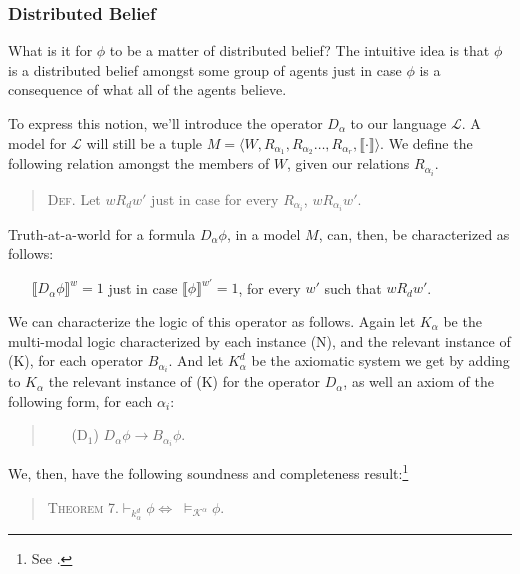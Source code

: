 \subsubsection{Distributed Belief}\label{caie-section1-4}

What is it for $\phi$ to be a matter of distributed belief?
The intuitive idea is that $\phi$ is a distributed belief amongst some group of agents just in case $\phi$ is a consequence of what all of the agents believe.

To express this notion, we'll introduce the operator $D_\alpha$ to our language $\mathcal{L}$. 
A model for $\mathcal{L}$ will still be a tuple $M = \langle W, R_{\alpha_1}, R_{\alpha_2}\ldots,R_{\alpha_r},  \llbracket \cdot \rrbracket \rangle$.
We define the following relation amongst the members of $W$, given our relations $R_{\alpha_i}$.
\begin{quote}
\textsc{Def.}\; Let $w R_d w'$ just in case for every $R_{\alpha_i}$, $w R_{\alpha_i} w'$.
\end{quote}
Truth-at-a-world for a formula $D_\alpha \phi$, in a model $M$, can, then, be characterized as follows:
\begin{itemize}
\item[] $\llbracket D_{\alpha} \phi \rrbracket^w = 1$ just in case $\llbracket \phi \rrbracket^{w'} = 1$, for every $w'$  such that $w R_d w'$.
\end{itemize}

We can characterize the logic of this operator as follows.
Again let $K_\alpha$ be the multi-modal logic characterized by each instance (N), and the relevant instance of (K), for each operator $B_{\alpha_i}$.
And let $K_\alpha^d$  be the axiomatic system we get by adding to $K_\alpha$  the relevant instance of (K) for the operator $D_{\alpha}$, as well an axiom of the following form, for each $\alpha_i$:
\begin{quote}
\begin{itemize}
\item[(D$_1$)]\quad $D_\alpha \phi \rightarrow B_{\alpha_i} \phi$.
\end{itemize}
\end{quote}

We, then, have the following soundness and completeness result:\footnote{See \citet{Halpern1}.}
\begin{quote}
\textsc{Theorem 7.}\quad $\vdash_{k_\alpha^d}  \phi \Leftrightarrow \; \models_{\mathcal{K}^\alpha} \phi$.
\end{quote}

